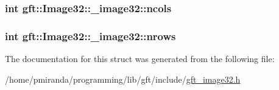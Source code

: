 \subsubsection[{\texorpdfstring{ncols}{ncols}}]{\setlength{\rightskip}{0pt plus 5cm}int gft\+::\+Image32\+::\+\_\+image32\+::ncols}\hypertarget{structgft_1_1Image32_1_1__image32_a6435c546474bb74eb8476b5683815b84}{}\label{structgft_1_1Image32_1_1__image32_a6435c546474bb74eb8476b5683815b84}
\subsubsection[{\texorpdfstring{nrows}{nrows}}]{\setlength{\rightskip}{0pt plus 5cm}int gft\+::\+Image32\+::\+\_\+image32\+::nrows}\hypertarget{structgft_1_1Image32_1_1__image32_aa912fd17d6133ee3d1fcf668865e4677}{}\label{structgft_1_1Image32_1_1__image32_aa912fd17d6133ee3d1fcf668865e4677}


The documentation for this struct was generated from the following file\+:\begin{DoxyCompactItemize}
\item 
/home/pmiranda/programming/lib/gft/include/\hyperlink{gft__image32_8h}{gft\+\_\+image32.\+h}\end{DoxyCompactItemize}
